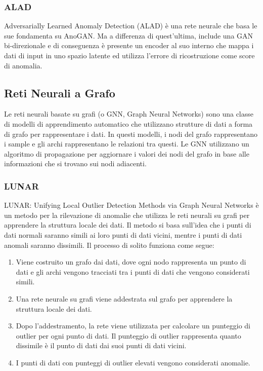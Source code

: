 \subsubsection{ALAD}
Adversarially Learned Anomaly Detection (ALAD) è una rete neurale che basa le sue fondamenta su AnoGAN. Ma a differenza di quest'ultima, include una GAN bi-direzionale e di conseguenza è presente un encoder al suo interno che mappa i dati di input in uno spazio latente ed utilizza l'errore di ricostruzione come score di anomalia.

\subsection{Reti Neurali a Grafo}
Le reti neurali basate su grafi (o GNN, Graph Neural Networks) sono una classe di modelli di apprendimento automatico che utilizzano strutture di dati a forma di grafo per rappresentare i dati. In questi modelli, i nodi del grafo rappresentano i sample e gli archi rappresentano le relazioni tra questi. Le GNN utilizzano un algoritmo di propagazione per aggiornare i valori dei nodi del grafo in base alle informazioni che si trovano sui nodi adiacenti.

\subsubsection{LUNAR}
LUNAR: Unifying Local Outlier Detection Methods via Graph Neural Networks è un metodo per la rilevazione di anomalie che utilizza le reti neurali su grafi per apprendere la struttura locale dei dati. Il metodo si basa sull'idea che i punti di dati normali saranno simili ai loro punti di dati vicini, mentre i punti di dati anomali saranno dissimili.
Il processo di solito funziona come segue:
\begin{enumerate}
\item Viene costruito un grafo dai dati, dove ogni nodo rappresenta un punto di dati e gli archi vengono tracciati tra i punti di dati che vengono considerati simili.
\item Una rete neurale su grafi viene addestrata sul grafo per apprendere la struttura locale dei dati.
\item Dopo l'addestramento, la rete viene utilizzata per calcolare un punteggio di outlier per ogni punto di dati. Il punteggio di outlier rappresenta quanto dissimile è il punto di dati dai suoi punti di dati vicini.
\item I punti di dati con punteggi di outlier elevati vengono considerati anomalie.

\end{enumerate}

